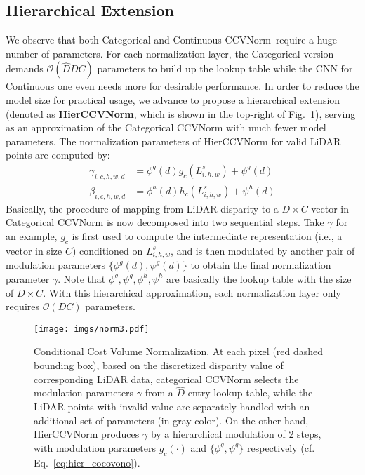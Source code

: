 \documentclass[letterpaper, 10 pt, conference]{ieeeconf}
\newcommand{\modelNameCBN}{CCVNorm }
\newcommand{\modelNameCBNPunc}{CCVNorm}
\newcommand{\modelNameHierCBN}{HierCCVNorm }
\newcommand{\modelNameHierCBNPunc}{HierCCVNorm}
\newcommand{\figref}{Fig.~\ref}
\begin{document}
{{}

\subsection{Hierarchical Extension}{
We observe that both Categorical and Continuous \modelNameCBNPunc~require a huge number of parameters. For each normalization layer, the Categorical version demands $\mathcal{O}(\hat{D}DC)$ parameters to build up the lookup table while the CNN for Continuous one even needs more for desirable performance. In order to reduce the model size for practical usage, we advance to propose a hierarchical extension (denoted as \textbf{\modelNameHierCBNPunc}, which is shown in the top-right of \figref{fig:normalization}), serving as an approximation of the Categorical \modelNameCBN with much fewer model parameters. The normalization parameters of \modelNameHierCBN for valid LiDAR points are computed by:
\begin{equation}
	\begin{split}
	\gamma_{i,c,h,w,d} &= \phi^g(d)g_c(L^s_{i,h,w})+\psi^g(d) \\
	\beta_{i,c,h,w,d} &= \phi^h(d)h_c(L^s_{i,h,w})+\psi^h(d)
    \end{split}
    \label{eq:hier_cocovono}
\end{equation}
\noindent Basically, the procedure of mapping from LiDAR disparity to a $D\times C$ vector in Categorical \modelNameCBN is now decomposed into two sequential steps. Take $\gamma$ for an example, $g_c$ is first used to compute the intermediate representation (i.e., a vector in size $C$) conditioned on $L_{i,h,w}^s$, and is then modulated by another pair of modulation parameters $\{\phi^g(d), \psi^g(d)\}$ to obtain the final normalization parameter $\gamma$. Note that $\phi^g, \psi^g, \phi^h, \psi^h$ are basically the lookup table with the size of $D\times C$. With this hierarchical approximation, each normalization layer only requires $\mathcal{O}(DC)$ parameters.

}
}

\begin{figure}[t]
\centering
\texttt{[image: imgs/norm3.pdf]}
\caption{\small{
Conditional Cost Volume Normalization. At each pixel (red dashed bounding box), based on the discretized disparity value of corresponding LiDAR data, categorical \modelNameCBN selects the modulation parameters $\gamma$ from a $\hat{D}$-entry lookup table, while the LiDAR points with invalid value are separately handled with an additional set of parameters (in gray color). On the other hand, \modelNameHierCBN produces $\gamma$ by a hierarchical modulation of 2 steps, with modulation parameters $g_c(\cdot)$ and $\{\phi^g, \psi^g\}$ respectively (cf. Eq.~\ref{eq:hier_cocovono}).
}}
\label{fig:normalization}
\end{figure}
\end{document}
